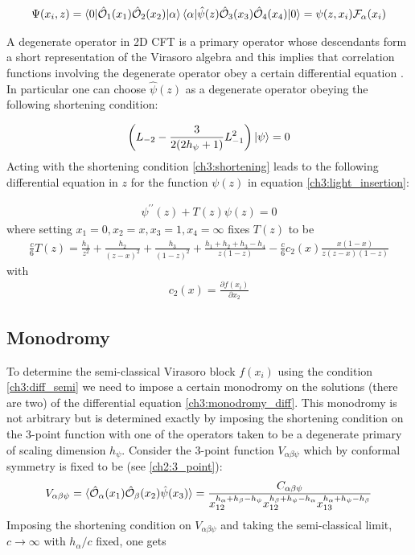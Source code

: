 \begin{align} \label{ch3:light_insertion}
 \Psi(x_i,z)= \braket{0|\hat{\mathcal{{O}}}_1(x_1)\hat{\mathcal{{O}}}_2(x_2)|\alpha}\braket{\alpha| \hat{\psi}(z)\hat{\mathcal{{O}}}_3(x_3)\hat{\mathcal{{O}}}_4(x_4)|0} = \psi(z,x_i) \mathcal{F}_{\alpha}(x_i)
\end{align}

  A degenerate  operator in 2D CFT is a primary operator whose descendants form a short representation of the Virasoro algebra and this implies that correlation functions involving the degenerate operator obey a certain differential equation \cite{Harlow:2011ny,Belavin:1984vu}. In particular one can choose $\hat{\psi}(z)$ as a degenerate operator obeying the following shortening condition:
  
  \begin{align} \label{ch3:shortening}
   \left( L_{-2} - \frac{3}{2(2 h_\psi+1)} L_{-1}^2\right) \ket{\psi} = 0
  \end{align}
  Acting with the shortening condition \ref{ch3:shortening} leads to the following differential equation in $z$ for the function $\psi(z)$ in equation \ref{ch3:light_insertion}:
  
  \begin{align}
   \psi^{\prime\prime}(z) + T(z)\psi(z) = 0
  \end{align}
  where setting $x_1=0, x_2=x,x_3=1, x_4=\infty$ fixes $T(z)$ to be 
  \begin{align} \label{ch3:monodromy_Tz}
   \frac{c}{6}T(z) = \frac{h_1}{z^2} + \frac{h_2}{(z-x)^2} +\frac{h_3}{(1-z)^2} + \frac{h_1+h_2+h_3-h_4}{z(1-z)} - \frac{c}{6} c_2(x) \frac{x(1-x)}{z(z-x)(1-z)}
  \end{align}
  with 
  \begin{align} \label{ch3:diff_semi}
   c_2(x)=\frac{\partial f(x_i)}{\partial x_2}
  \end{align}

  \subsection{Monodromy}
  
  To determine the semi-classical Virasoro block $f(x_i)$ using the condition \ref{ch3:diff_semi} we need to impose a certain monodromy on the solutions (there are two) of the differential equation \ref{ch3:monodromy_diff}. This monodromy is not arbitrary but is determined exactly by imposing the shortening condition on the 3-point function with one of the operators taken to be a degenerate primary of scaling dimension $h_\psi$. Consider the 3-point function $V_{\alpha \beta \psi}$ which by conformal symmetry is fixed to be (see \ref{ch2:3_point}):
  \begin{align}
   V_{\alpha \beta \psi} = \braket{\hat{\mathcal{{O}}}_\alpha(x_1) \hat{\mathcal{{O}}}_\beta(x_2) \hat{\psi}(x_3)}=\frac{C_{\alpha \beta \psi}}{x_{12}^{h_\alpha+h_\beta-h_\psi} x_{12}^{h_\beta+h_\psi-h_\alpha}x_{13}^{h_\alpha+h_\psi-h_\beta}}
  \end{align}
  Imposing the shortening condition on $V_{\alpha \beta \psi}$ and taking the semi-classical limit, $c \to \infty$ with $h_\alpha / c$ fixed, one gets
  
